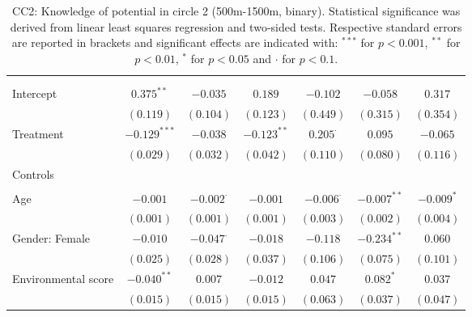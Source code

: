 \begin{center}
\begin{small}
\begin{longtable}{l@{} c@{} c@{} c@{} c@{} c@{} c@{}}
\hline
\endhead
\hline
\endfoot
\hline
\multicolumn{7}{l}{\tiny{
}}\\
\caption{CC2: Knowledge of potential in circle 2 (500m-1500m, binary). Statistical significance was derived from linear least squares regression and two-sided tests. 
                Respective standard errors are reported in brackets and significant effects are indicated with: $^{***}$ for $p < 0.001$, $^{**}$ for $p < 0.01$, $^*$ for $p < 0.05$ and $\cdot$ for $p < 0.1$.}
\label{table:coefficients}
\endlastfoot \\
Intercept                           & $0.375^{**}$   & $-0.035$         & $0.189$       & $-0.102$         & $-0.058$      & $0.317$      \\
                                    & $(0.119)$      & $(0.104)$        & $(0.123)$     & $(0.449)$        & $(0.315)$     & $(0.354)$    \\
Treatment                           & $-0.129^{***}$ & $-0.038$         & $-0.123^{**}$ & $0.205^{\cdot}$  & $0.095$       & $-0.065$     \\
                                    & $(0.029)$      & $(0.032)$        & $(0.042)$     & $(0.110)$        & $(0.080)$     & $(0.116)$    \\
Controls                            &                &                  &               &                  &               &              \\
                                    &                &                  &               &                  &               &              \\
\quad Age                           & $-0.001$       & $-0.002^{\cdot}$ & $-0.001$      & $-0.006^{\cdot}$ & $-0.007^{**}$ & $-0.009^{*}$ \\
                                    & $(0.001)$      & $(0.001)$        & $(0.001)$     & $(0.003)$        & $(0.002)$     & $(0.004)$    \\
\quad Gender: Female                & $-0.010$       & $-0.047^{\cdot}$ & $-0.018$      & $-0.118$         & $-0.234^{**}$ & $0.060$      \\
                                    & $(0.025)$      & $(0.028)$        & $(0.037)$     & $(0.106)$        & $(0.075)$     & $(0.101)$    \\
\quad Environmental score           & $-0.040^{**}$  & $0.007$          & $-0.012$      & $0.047$          & $0.082^{*}$   & $0.037$      \\
                                    & $(0.015)$      & $(0.015)$        & $(0.015)$     & $(0.063)$        & $(0.037)$     & $(0.047)$    \\

\end{longtable}
\end{small}
\end{center}
